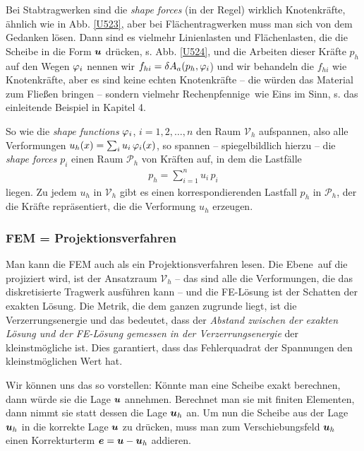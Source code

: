 Bei Stabtragwerken sind die {\em shape forces\/} (in der Regel) wirklich Knotenkr\"{a}fte, \"{a}hnlich wie in Abb. \ref{U523}, aber bei Fl\"{a}chentragwerken muss man sich von dem Gedanken l\"{o}sen. Dann sind es  vielmehr Linienlasten und Fl\"{a}chenlasten, die die Scheibe  in die Form $\mbox{\boldmath $u$}$ dr\"{u}cken, s. Abb. \ref{U524}, und die Arbeiten dieser Kr\"{a}fte $p_h$ auf den Wegen $\varphi_i$ nennen wir $f_{hi} = \delta A_a(p_h,\varphi_i$) und wir behandeln die $f_{hi}$ wie \glq Knotenkr\"{a}fte\grq, aber es sind keine echten Knotenkr\"{a}fte -- die w\"{u}rden das Material zum Flie{\ss}en bringen -- sondern vielmehr \glq Rechenpfennige\grq\ wie Eins im Sinn, s. das einleitende Beispiel in Kapitel 4.

So wie die {\em shape functions\/} $\varphi_i$, $i = 1,2,\ldots, n$ den Raum $\mathcal{V}_h$ aufspannen, also alle Verformungen $u_h(x) = \sum_i u_i\,\varphi_i(x)$, so spannen -- spiegelbildlich hierzu -- die {\em shape forces\/} $p_i$ einen Raum $\mathcal{P}_h$ von Kr\"{a}ften auf, in dem die Lastf\"{a}lle
\begin{align}
p_h = \sum_{i = 1}^n u_i\,p_i
\end{align}
liegen. Zu jedem $u_h $ in $\mathcal{V}_h $ gibt es einen korrespondierenden Lastfall $p_h $ in $\mathcal{P}_h $, der die Kr\"{a}fte repr\"{a}sentiert, die die Verformung $u_h $ erzeugen.

{\textcolor{sectionTitleBlue}{\subsubsection*{FEM = Projektionsverfahren}}}

Man kann die FEM auch als ein Projektionsverfahren lesen. Die \glq Ebene\grq\, auf die projiziert wird,  ist der Ansatzraum $\mathcal{V}_{h}$ -- das sind alle die Verformungen, die das diskretisierte Tragwerk ausf\"{u}hren kann -- und die FE-L\"{o}sung ist der Schatten der exakten L\"{o}sung. Die Metrik, die dem ganzen zugrunde liegt, ist die Verzerrungsenergie und das bedeutet, dass der {\em Abstand zwischen der exakten L\"{o}sung und der FE-L\"{o}sung gemessen in der Verzerrungsenergie} der kleinstm\"{o}gliche ist. Dies garantiert, dass das Fehlerquadrat der Spannungen den kleinstm\"{o}glichen Wert hat.

Wir k\"{o}nnen uns das so vorstellen: K\"{o}nnte man eine Scheibe exakt berechnen, dann w\"{u}rde sie die Lage $\mbox{\boldmath $u$}$ annehmen. Berechnet man sie mit finiten Elementen, dann nimmt sie statt dessen die Lage $\mbox{\boldmath $u$}_{h} $ an. Um nun die Scheibe aus der Lage $\mbox{\boldmath $u$}_{h} $ in die korrekte Lage $\mbox{\boldmath $u$}$ zu dr\"{u}cken, muss man zum Verschiebungsfeld $\mbox{\boldmath $u$}_{h} $ einen Korrekturterm $\mbox{\boldmath $e$} = \mbox{\boldmath $u$} - \mbox{\boldmath $u$}_h$ addieren.

